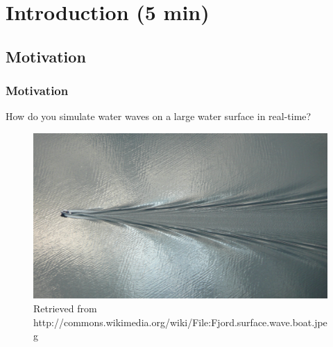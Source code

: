 \section{Introduction (5 min)}

\subsection{Motivation}

\begin{frame}
\frametitle{Motivation}
How do you simulate water waves on a large water surface in real-time?

\begin{figure}
\centering
\includegraphics[width=.8\textwidth]{Images/Attribute/Wake/Fjord_surface_wave_boat}
\caption{Retrieved from http://commons.wikimedia.org/wiki/File:Fjord.surface.wave.boat.jpeg}
\end{figure}

\end{frame}

